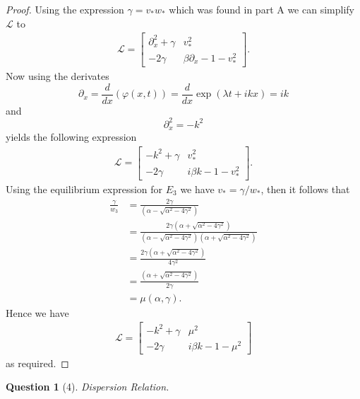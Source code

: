 \documentclass[11pt]{article}
\theoremstyle{quest}
\newtheorem*{question}{Question}
\newcommand{\Dp}{\partial}
\newcommand{\Bl}{\mathcal{L}}
\begin{document}
\begin{proof}
    Using the expression $\gamma = v_* w_*$ which was found in part A we can simplify $\Bl$
    to 
    \begin{align*}
        \Bl =
        \begin{bmatrix}
            \Dp_x^2 + \gamma & v_*^2\\
            - 2\gamma & \beta \Dp_x -1  -v_*^2
        \end{bmatrix}.
    \end{align*}
    Now using the derivates $$\Dp_x = \frac{d}{dx}( \varphi(x,t) ) = \frac{d}{dx} \exp{ \left( \lambda t+ i k x  \right)  } = ik$$ 
    and $$ \Dp_x^2 = -k^2$$ 
    yields the following expression
    \begin{align*}
        \Bl =
        \begin{bmatrix}
            -k^2 + \gamma & v_*^2\\
            - 2\gamma & i\beta k  -1  -v_*^2
        \end{bmatrix}
        .
    \end{align*}
    Using the equilibrium expression for $E_3$ we have $v_* = \gamma/ w_*$, then it follows that
    \begin{align*}
        \frac{\gamma}{w_3} &= \frac{ 2 \gamma }{(\alpha - \sqrt{ \alpha^2 - 4 \gamma^2 })} \\
                           &= \frac{2 \gamma (\alpha + \sqrt{ \alpha^2 - 4 \gamma^2 })}{(\alpha - \sqrt{ \alpha^2 - 4 \gamma^2 })(\alpha + \sqrt{ \alpha^2 - 4 \gamma^2 })} \\
                           &= \frac{ 2 \gamma (\alpha + \sqrt{ \alpha^2 - 4 \gamma^2 }) }{4\gamma^2} \\
                           &= \frac{(\alpha + \sqrt{ \alpha^2 - 4 \gamma^2 }) }{2 \gamma} \\ 
                           &= \mu(\alpha, \gamma).
    \end{align*}
    Hence we have
    \begin{align*}
        \Bl =
        \begin{bmatrix}
            -k^2 + \gamma & \mu^2\\
            - 2\gamma & i\beta k  -1  -\mu^2
        \end{bmatrix}
    \end{align*}
    as required.
\end{proof}
\clearpage
\begin{question}[4]
    Dispersion Relation. 
\end{question}
\end{document}
